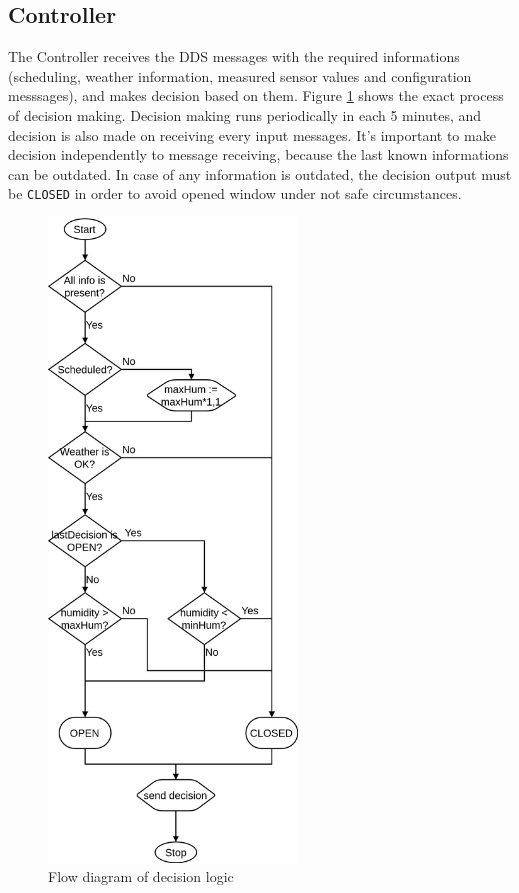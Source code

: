 \documentclass{article}
\begin{document}
\subsection{Controller}
The Controller receives the DDS messages with the required informations (scheduling, weather information, measured sensor values and configuration messsages), and makes decision based on them. Figure \ref{fig:decision_logic} shows the exact process of decision making. Decision making runs periodically in each 5 minutes, and decision is also made on receiving every input messages. It's important to make decision independently to message receiving, because the last known informations can be outdated. In case of any information is outdated, the decision output must be \verb+CLOSED+ in order to avoid opened window under not safe circumstances.
\begin{figure}[!htb]
\centering
  \includegraphics[width=250px]{imgs/decision_logic.png}
  \caption{Flow diagram of decision logic}
  \label{fig:decision_logic}
\end{figure} 
\end{document}
